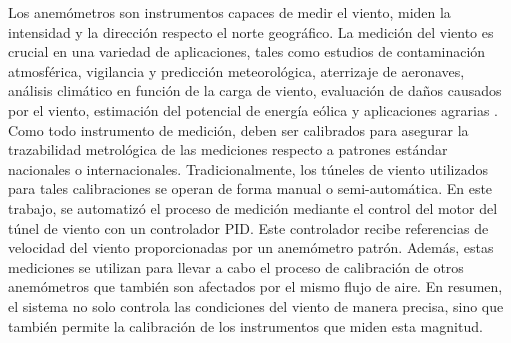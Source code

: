 Los anemómetros son instrumentos capaces de medir el viento, miden la intensidad y la dirección respecto el norte geográfico. La medición del viento es crucial en una variedad de aplicaciones, tales como estudios de contaminación atmosférica, vigilancia y predicción meteorológica, aterrizaje de aeronaves, análisis climático en función de la carga de viento, evaluación de daños causados por el viento, estimación del potencial de energía eólica y aplicaciones agrarias \cite{wmoChapter8}. Como todo instrumento de medición, deben ser calibrados para asegurar la trazabilidad metrológica de las mediciones respecto a patrones estándar nacionales o internacionales. Tradicionalmente, los túneles de viento utilizados para tales calibraciones se operan de forma manual o semi-automática. En este trabajo, se automatizó el proceso de medición mediante el control del motor del túnel de viento con un controlador PID. Este controlador recibe referencias de velocidad del viento proporcionadas por un anemómetro patrón. Además, estas mediciones se utilizan para llevar a cabo el proceso de calibración de otros anemómetros que también son afectados por el mismo flujo de aire. En resumen, el sistema no solo controla las condiciones del viento de manera precisa, sino que también permite la calibración de los instrumentos que miden esta magnitud.

